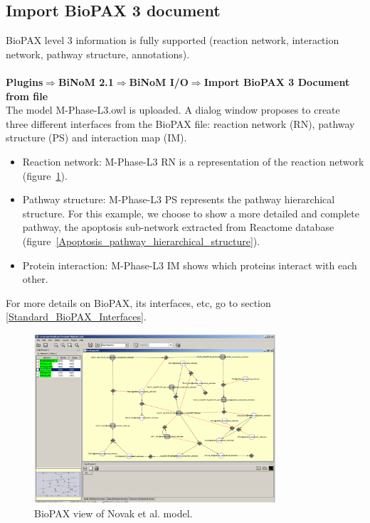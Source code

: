 \subsection{Import BioPAX 3 document}
BioPAX level 3 information is fully supported (reaction network, interaction network, pathway structure, annotations).\\\\
\textbf{Plugins$\Rightarrow$BiNoM 2.1$\Rightarrow$BiNoM  I/O$\Rightarrow$Import BioPAX 3 Document from file}\\
The model M-Phase-L3.owl \cite{novak1998model} is uploaded. A dialog window
proposes to create three different interfaces from the BioPAX file: reaction
network (RN), pathway structure (PS) and interaction map (IM).

\begin{itemize}
\item Reaction network: M-Phase-L3 RN is a representation of the reaction network (figure~\ref{View_BioPAX_of_Novak}).
\item Pathway structure: M-Phase-L3 PS represents the pathway hierarchical
structure. For this example, we choose to show a more detailed and complete
pathway, the apoptosis sub-network extracted from Reactome database
(figure~\ref{Apoptosis_pathway_hierarchical_structure}).
\item Protein interaction: M-Phase-L3 IM shows which proteins interact with each other.
\end{itemize}
For more details on BioPAX, its interfaces, etc, go to section \ref{Standard_BioPAX_Interfaces}.
\begin{figure}
\centering
\includegraphics[width=0.8\textwidth]{graphics/View_BioPAX_of_Novak}
\caption{BioPAX view of Novak et al. model.}
\label{View_BioPAX_of_Novak}
\end{figure}
